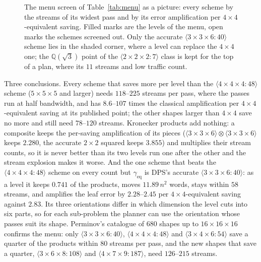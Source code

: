 \documentclass[11pt]{article}
\newcommand{\mm}[1]{\langle #1\rangle}
\begin{document}
\begin{figure}[!tbp]
\caption{The menu screen of Table~\ref{tab:menu} as a picture: every scheme
by the streams of its widest pass and by its error amplification per
$4\times4$-equivalent saving.  Filled marks are the levels of the menu, open
marks the schemes screened out.  Only the accurate $\mm{3\times3\times6:40}$
scheme lies in the shaded corner, where a level can replace the $4\times4$
one; the $\mathbb{Q}(\sqrt3)$ point of the $\mm{2\times2\times2:7}$ class is kept for the top of a
plan, where its $11$ streams and low traffic count.}
\label{fig:menu}
\end{figure}

Three conclusions.  Every scheme that saves more per level than the
$\mm{4\times4\times4:48}$ scheme ($5\times5\times5$ and larger) needs $118$--$225$ streams per
pass, where the passes run at half bandwidth, and has $8.6$--$107$ times the
classical amplification per $4\times4$-equivalent saving at its published
point; the other shapes larger than $4\times4$ save no more and still need
$78$--$120$ streams.
Kronecker products add nothing: a composite keeps the per-saving
amplification of its pieces ($\mm{3\times3\times6}\otimes\mm{3\times3\times6}$
keeps $2.280$, the accurate $2\times2$ squared keeps $3.855$) and multiplies
their stream counts, so it is never better than its two levels run one after
the other and the stream explosion makes it worse.  And the one scheme that
beats the $\mm{4\times4\times4:48}$ scheme on every count but $\gamma_{\text{eq}}$ is DPS's
accurate $\mm{3\times3\times6:40}$: as a level it keeps $0.741$ of the
products, moves $11.89\,n^2$ words, stays within $58$ streams, and amplifies
the leaf error by $2.28$--$2.45$ per $4\times4$-equivalent saving against
$2.83$.  Its three orientations differ in which dimension the level cuts into
six parts, so for each sub-problem the planner can use the orientation whose
passes suit its shape.  Perminov's catalogue of
$680$ shapes up to $16\times16\times16$ \cite{Perminov} confirms the menu: only
$\mm{3\times3\times6:40}$, $\mm{4\times4\times4:48}$ and $\mm{3\times4\times6:54}$
save a quarter of the products within $80$ streams per pass, and the new
shapes that save a quarter, $\mm{3\times6\times8:108}$ and $\mm{4\times7\times9:187}$,
need $126$--$215$ streams.
\end{document}
